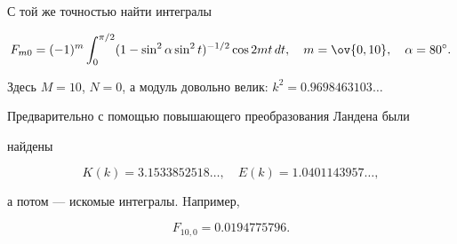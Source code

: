  


\begin{exam} 


С той же точностью найти интегралы 


$$ 


F_{m0}=(-1)^m\int^{\pi/2}_0(1-\sin^2\alpha\sin^2t)^{-1/2} 


\cos2m t\,dt,\quad m=\ov{0,10},\quad \alpha=80^\circ. 


$$ 


 


Здесь $M=10$, $N=0$, а модуль довольно велик: $k^2=0.9698463103\dotsc$ 


Предварительно с помощью повышающего преобразования Ландена были 


найдены 


$$ 


K(k)=3.1533852518\dotsc,\quad E(k)=1.0401143957\dotsc, 


$$ 


а потом --- искомые интегралы. Hапример, 


$$ 


F_{10,0}=0.0194775796. 


$$ 


\end{exam} 


 


